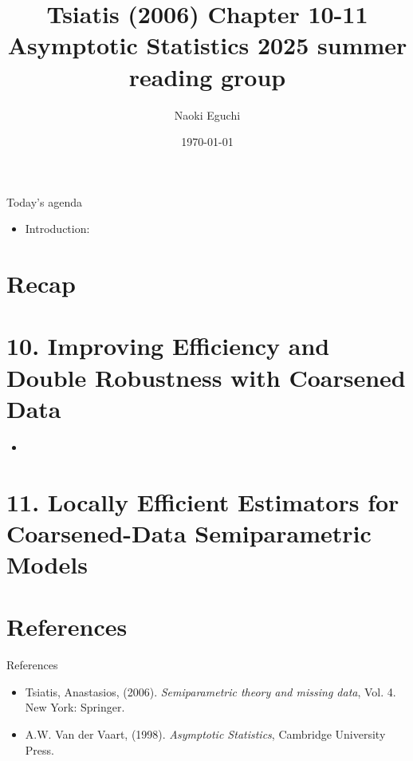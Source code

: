 \documentclass[xcolor=dvipsnames,aspectratio=169]{beamer}
\begin{document}
 

\title{Tsiatis (2006) Chapter 10-11\\ \small{Asymptotic Statistics 2025 summer reading group}}
\author{Naoki Eguchi}          
\date{\today}

\begin{frame}                  
    \titlepage                     
\end{frame}

\begin{frame}{Today's agenda}                  
    \begin{itemize}
        \item Introduction: 
    \end{itemize}
\end{frame}

\section{Recap}

\begin{frame}
    
\end{frame}

\section{10. Improving Efficiency and Double Robustness with Coarsened Data}

\begin{frame}
    \begin{itemize}
        \item 
    \end{itemize}
\end{frame}

\section{11. Locally Efficient Estimators for Coarsened-Data Semiparametric Models}

\section*{References}

\begin{frame}{References}
    \begin{itemize}
        \item Tsiatis, Anastasios, (2006).
        \textit{Semiparametric theory and missing data}, Vol. 4. New York: Springer.
        \item A.W. Van der Vaart, (1998). 
        \textit{Asymptotic Statistics}, Cambridge University Press.
    \end{itemize}
\end{frame}
\end{document}
